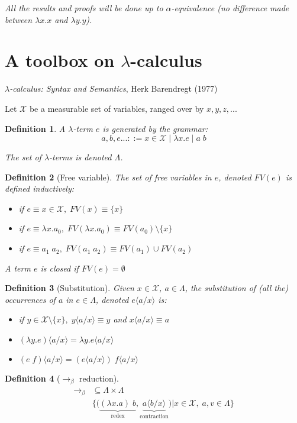 \documentclass{article}
\newtheorem{defi}{Definition}
\newcommand\subst[2]{\langle #1\big/#2\rangle}
\begin{document}
\emph{All the results and proofs will be done up to  $\alpha$-equivalence (no difference made between $\lambda x.x$ and $\lambda y.y$).}


\section{A toolbox on $\lambda$-calculus}
\emph{$\lambda$-calculus: Syntax and Semantics}, Herk Barendregt (1977)
\bigskip


Let $\mathcal{X}$ be a measurable set of variables, ranged over by $x,y,z,...$

\begin{defi}
A $\lambda$-term $e$ is generated by the grammar:
\[ a,b,e ... ::= x\in \mathcal{X} \;|\; \lambda x.e \; | \; a \; b\]

The set of $\lambda$-terms is denoted $\Lambda$.
\end{defi}


\begin{defi}[Free variable]
The set of free variables in $e$, denoted $FV(e)$ is defined inductively:
\begin{itemize}
\item if $e\equiv x\in \mathcal{X},\; FV(x)\equiv\{x\}$
\item if $e\equiv \lambda x . a_0, \; FV(\lambda x.a_0) \equiv FV(a_0)\setminus \{x\}$
\item if $e\equiv a_1 \; a_2, \; FV(a_1\;a_2)\equiv FV(a_1) \cup FV(a_2)$
\end{itemize}
A term $e$ is \emph{closed} if $FV(e)=\emptyset$
\end{defi}

\begin{defi}[Substitution]
Given $x \in \mathcal{X}$, $a\in \Lambda$, the substitution of (all the) occurrences of $a$ in $e\in \Lambda$, denoted $e\subst{a}{x}$ is:
\begin{itemize}
\item if $y\in \mathcal{X} \setminus \{x\}, \; y\subst{a}{x}\equiv y $ and $x\subst{a}{x}\equiv a$
\item $(\lambda y.e)\subst{a}{x} = \lambda y.e \subst{a}{x}$
\item $(e\; f)\subst{a}{x} = (e\subst{a}{x})\; f\subst{a}{x} $
\end{itemize}
\end{defi}

\begin{defi}[$\to_\beta$ reduction]
\begin{align*}
\to_\beta & \subseteq \Lambda \times \Lambda\\
& \Big\{ \big( \underbrace{(\lambda x.a)\; b}_{\text{redex}},\underbrace{a\subst{b}{x}}_{\text{contraction}}\big)\big| x\in \mathcal{X},\; a,v \in \Lambda \Big\}
\end{align*}
\end{defi}
\end{document}
